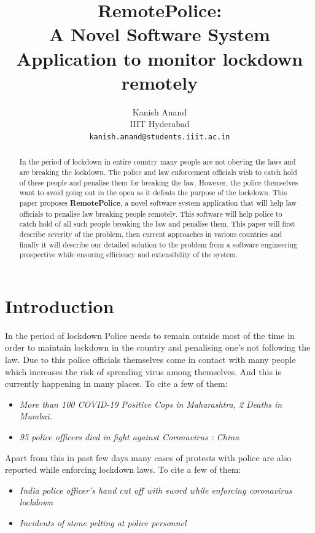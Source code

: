 \documentclass[10pt,twocolumn,letterpaper]{article}
\begin{document}
\title{RemotePolice:\\
A Novel Software System Application to monitor lockdown remotely}
\author{Kanish Anand\\
IIIT Hyderabad\\
{\tt\small kanish.anand@students.iiit.ac.in}
}

\maketitle

\begin{abstract}
    In the period of lockdown in entire country many people are not obeying the laws and are breaking the lockdown. The police and law enforcement officials wish to catch hold of these people and penalise them for breaking the law. However, the police themselves want to avoid going out in the open as it defeats the purpose of the lockdown. This paper proposes \textbf{RemotePolice}, a novel software system application that will help law officials to penalise law breaking people remotely. This software will help police to catch hold of all such people breaking the law and penalise them.
    This paper will first describe severity of the problem, then current approaches in various countries and finally it will describe our detailed solution to the problem from a software engineering prospective while ensuring efficiency and extensibility of the system.
\end{abstract}

\section{Introduction}
In the period of lockdown Police needs to remain outside most of the time in order to maintain lockdown in the country and penalising one's not following the law. Due to this police officials themselves come in contact with many people which increases the risk of spreading virus among themselves. And this is currently happening in many places. To cite a few of them:
\begin{itemize}
\item{\emph{More than 100 COVID-19 Positive Cops in Maharashtra, 2 Deaths in Mumbai.\cite{100cops}}}
\item{\emph{95 police officers died in fight against Coronavirus : China}\cite{95died}}
\end{itemize}
Apart from this in past few days many cases of protests with police are also reported while enforcing lockdown laws. To cite a few of them: 
\begin{itemize}

\item{\emph{India police officer's hand cut off with sword while enforcing coronavirus lockdown}\cite{handcut}}
\item{\emph{Incidents of stone pelting at police personnel}\cite{stonepelting}}
\end{itemize}
\end{document}
